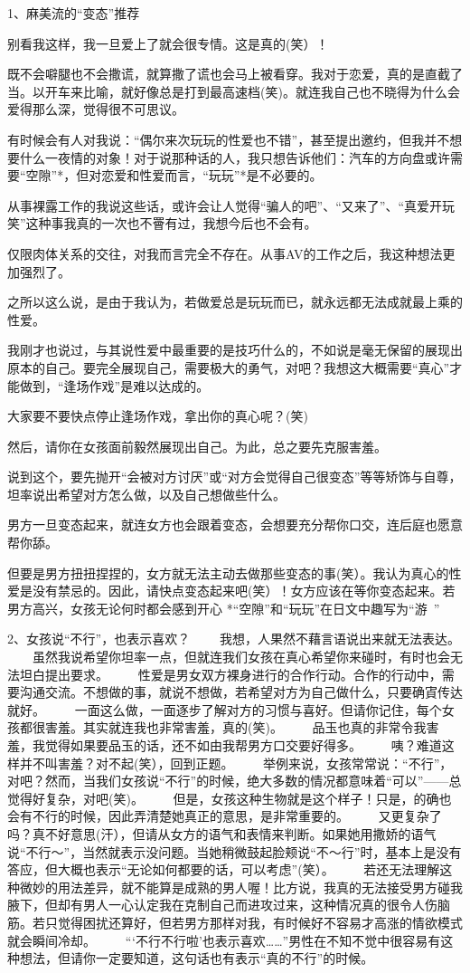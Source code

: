 \documentclass[12pt,UTF8]{ctexbook}
\begin{document}
1、麻美流的“变态”推荐

别看我这样，我一旦爱上了就会很专情。这是真的(笑）！

既不会噼腿也不会撒谎，就算撒了谎也会马上被看穿。我对于恋爱，真的是直截了当。以开车来比喻，就好像总是打到最高速档(笑)。就连我自己也不晓得为什么会爱得那么深，觉得很不可思议。

有时候会有人对我说：“偶尔来次玩玩的性爱也不错”，甚至提出邀约，但我并不想要什么一夜情的对象！对于说那种话的人，我只想告诉他们：汽车的方向盘或许需要“空隙”*，但对恋爱和性爱而言，“玩玩”*是不必要的。

从事裸露工作的我说这些话，或许会让人觉得“骗人的吧”、“又来了”、“真爱开玩笑”这种事我真的一次也不罾有过，我想今后也不会有。

仅限肉体关系的交往，对我而言完全不存在。从事AV的工作之后，我这种想法更加强烈了。

之所以这么说，是由于我认为，若做爱总是玩玩而已，就永远都无法成就最上乘的性爱。

我刚才也说过，与其说性爱中最重要的是技巧什么的，不如说是毫无保留的展现出原本的自己。要完全展现自己，需要极大的勇气，对吧？我想这大概需要“真心”才能做到，“逢场作戏”是难以达成的。

大家要不要快点停止逢场作戏，拿出你的真心呢？(笑)

然后，请你在女孩面前毅然展现出自己。为此，总之要先克服害羞。

说到这个，要先抛开“会被对方讨厌”或“对方会觉得自己很变态”等等矫饰与自尊，坦率说出希望对方怎么做，以及自己想做些什么。

男方一旦变态起来，就连女方也会跟着变态，会想要充分帮你口交，连后庭也愿意帮你舔。

但要是男方扭扭捏捏的，女方就无法主动去做那些变态的事(笑）。我认为真心的性爱是没有禁忌的。因此，请快点变态起来吧(笑）！女方应该在等你变态起来。若男方高兴，女孩无论何时都会感到开心
*“空隙”和“玩玩”在日文中趣写为“游~”

2、女孩说“不行”，也表示喜欢？ 　　我想，人果然不藉言语说出来就无法表达。 　　虽然我说希望你坦率一点，但就连我们女孩在真心希望你来碰时，有时也会无法坦白提出要求。 　　性爱是男女双方裸身进行的合作行动。合作的行动中，需要沟通交流。不想做的事，就说不想做，若希望对方为自己做什么，只要确寊传达就好。 　　一面这么做，一面逐步了解对方的习惯与喜好。但请你记住，每个女孩都很害羞。其实就连我也非常害羞，真的(笑)。 　　品玉也真的非常令我害羞，我觉得如果要品玉的话，还不如由我帮男方口交要好得多。 　　咦？难道这样并不叫害羞？对不起(笑），回到正题。 　　举例来说，女孩常常说：“不行”，对吧？然而，当我们女孩说“不行”的时候，绝大多数的情况都意味着“可以”——总觉得好复杂，对吧(笑)。 　　但是，女孩这种生物就是这个样子！只是，的确也会有不行的时候，因此弄清楚她真正的意思，是非常重要的。 　　又更复杂了吗？真不好意思(汗），但请从女方的语气和表情来判断。如果她用撒娇的语气说“不行〜”，当然就表示没问题。当她稍微鼓起脸颊说“不〜行”时，基本上是没有答应，但大概也表示“无论如何都要的话，可以考虑”(笑）。 　　若还无法理解这种微妙的用法差异，就不能算是成熟的男人喔！比方说，我真的无法接受男方碰我腋下，但却有男人一心认定我在克制自己而进攻过来，这种情况真的很令人伤脑筋。若只觉得困扰还算好，但若男方那样对我，有时候好不容易才高涨的情欲模式就会瞬间冷却。 　　“‘不行不行啦’也表示喜欢……”男性在不知不觉中很容易有这种想法，但请你一定要知道，这句话也有表示“真的不行”的时候。
\end{document}
